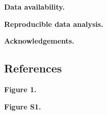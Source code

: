 \documentclass[
]{article}
\newlength{\cslhangindent}
\newlength{\cslentryspacingunit} %
\newenvironment{CSLReferences}[2] %
 {%
  \setlength{\parindent}{0pt}
  \ifodd #1
  \let\oldpar\par
  \def\par{\hangindent=\cslhangindent\oldpar}
  \fi
  \setlength{\parskip}{#2\cslentryspacingunit}
 }%
 {}
\begin{document}
\textbf{Data availability.}

\textbf{Reproducible data analysis.}

\vspace{10mm}

\textbf{Acknowledgements.}

\newpage

\hypertarget{references}{%
\subsection{References}\label{references}}

\setlength{\parindent}{-0.25in}
\setlength{\leftskip}{0.25in}

\noindent

\hypertarget{refs}{}
\begin{CSLReferences}{0}{0}
\end{CSLReferences}

\setlength{\parindent}{0in}
\setlength{\leftskip}{0in}

\newpage

\textbf{Figure 1.}

\newpage

\textbf{Figure S1.}
\end{document}
